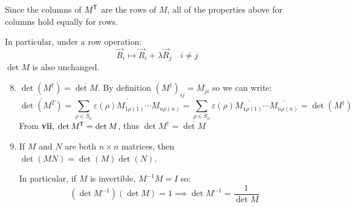 \documentclass[../main.tex]{subfiles}
\begin{document}
\begin{remark}
  Since the columns of $M^{{\mkern-1.5mu\mathsf{T}}}$ are the rows of $M$, all of the properties above for columns hold equally for rows.

  In particular, under a row operation:
  \[
    \vec{R}_i \mapsto \vec{R}_i +\lambda \vec{R}_j \quad i \neq j
  \]
  $\det M$ is also unchanged.
\end{remark}
\begin{enumerate}
  \setcounter{enumi}{7}
  \item $\det (M^{\dag}) = \overline{\det M}$.
    By definition $(M^{\dag})_{i j} = \overline{M_{j i}}$ so we can write:
    \[
      \overline{\det (M^{T})} = \overline{\sum_{\rho \in S_n} \varepsilon(\rho) M_{1 \rho(1)} \cdots M_{n \rho(n)}} = \sum_{\rho \in S_n} \varepsilon(\rho) \overline{M_{1 \rho(1)}} \cdots \overline{M_{n \rho(n)}} = \det (M^{\dag})
    \]
    From \textbf{vii}, $\det M^{{\mkern-1.5mu\mathsf{T}}} = \det M$, thus $\det M^{\dag} = \overline{\det M}$
  \item If $M$ and $N$ are both $n \times n$ matrices, then $\det(MN) = \det(M)\det(N)$.

    In particular, if $M$ is invertible, $M^{-1} M = I$ so:
    \[
      (\det M^{-1})(\det M) = 1 \implies \det M^{-1} = \frac{1}{\det M}
    \]
\end{enumerate}
\end{document}
